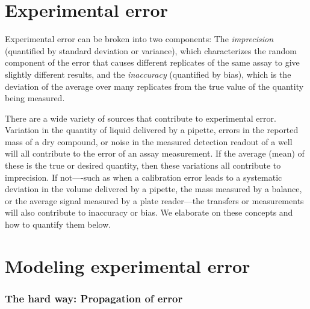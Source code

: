 \documentclass[aps,pre,twocolumn,nofootinbib,superscriptaddress,linenumbers]{revtex4-1}
\begin{document}
\section{Experimental error}

Experimental error can be broken into two components: The \emph{imprecision} (quantified by standard deviation or variance), which characterizes the random component of the error that causes different replicates of the same assay to give slightly different results, and the \emph{inaccuracy} (quantified by bias), which is the deviation of the average over many replicates from the true value of the quantity being measured.

There are a wide variety of sources that contribute to experimental error. 
Variation in the quantity of liquid delivered by a pipette, errors in the reported mass of a dry compound, or noise in the measured detection readout of a well will all contribute to the error of an assay measurement.
If the average (mean) of these is the true or desired quantity, then these variations all contribute to imprecision.
If not----such as when a calibration error leads to a systematic deviation in the volume delivered by a pipette, the mass measured by a balance, or the average signal measured by a plate reader---the transfers or measurements will also contribute to inaccuracy or bias.
We elaborate on these concepts and how to quantify them below.

\section*{Modeling experimental error}

\subsubsection{The hard way: Propagation of error}
\end{document}
